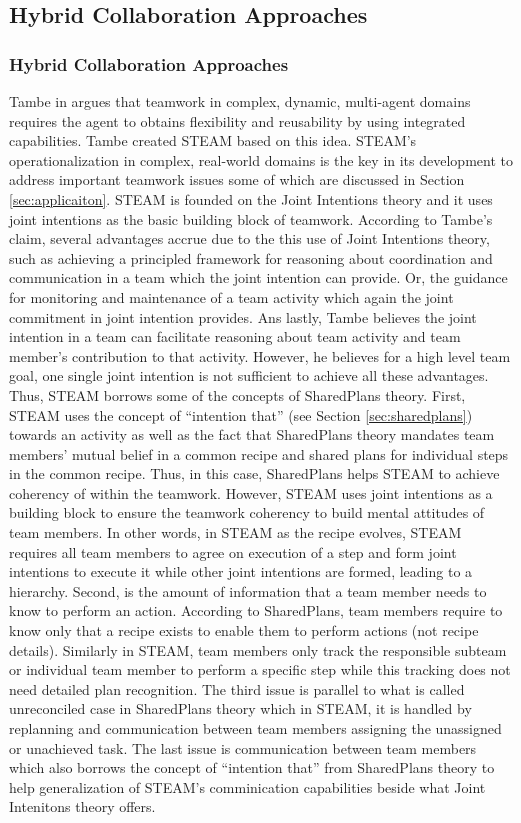 \documentclass[11pt]{article}
\begin{document}
\subsection{Hybrid Collaboration Approaches}

\subsubsection{Hybrid Collaboration Approaches}

Tambe in \cite{tambe:flexible-teamwork} argues that teamwork in complex,
dynamic, multi-agent domains requires the agent to obtains flexibility and
reusability by using integrated capabilities. Tambe created STEAM based on this
idea. STEAM's operationalization in complex, real-world domains is the key in
its development to address important teamwork issues some of which are discussed
in Section \ref{sec:applicaiton}. STEAM is founded on the Joint Intentions
theory and it uses joint intentions as the basic building block of teamwork.
According to Tambe's claim, several advantages accrue due to the this use of
Joint Intentions theory, such as achieving a principled framework for reasoning
about coordination and communication in a team which the joint intention can
provide. Or, the guidance for monitoring and maintenance of a team activity
which again the joint commitment in joint intention provides. Ans lastly, Tambe
believes the joint intention in a team can facilitate reasoning about team
activity and team member's contribution to that activity. However, he believes
for a high level team goal, one single joint intention is not sufficient to
achieve all these advantages. Thus, STEAM borrows some of the concepts of
SharedPlans theory. First, STEAM uses the concept of ``intention that'' (see
Section \ref{sec:sharedplans}) towards an activity as well as the fact that
SharedPlans theory mandates team members' mutual belief in a common recipe and
shared plans for individual steps in the common recipe. Thus, in this case,
SharedPlans helps STEAM to achieve coherency of within the teamwork. However,
STEAM uses joint intentions as a building block to ensure the teamwork coherency
to build mental attitudes of team members. In other words, in STEAM as the
recipe evolves, STEAM requires all team members to agree on execution of a step
and form joint intentions to execute it while other joint intentions are formed,
leading to a hierarchy. Second, is the amount of information that a team member
needs to know to perform an action. According to SharedPlans, team members
require to know only that a recipe exists to enable them to perform actions
(not recipe details). Similarly in STEAM, team members only track the
responsible subteam or individual team member to perform a specific step while
this tracking does not need detailed plan recognition. The third issue is
parallel to what is called unreconciled case in SharedPlans theory which in
STEAM, it is handled by replanning and communication between team members
assigning the unassigned or unachieved task. The last issue is communication
between team members which also borrows the concept of ``intention that'' from
SharedPlans theory to help generalization of STEAM's comminication capabilities 
beside what Joint Intenitons theory offers.
\end{document}
